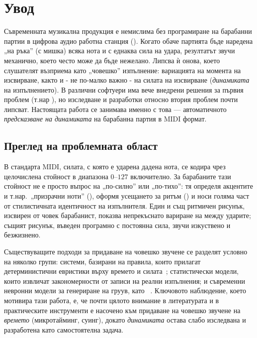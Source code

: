 \chapter{Увод}
\label{ch:uvod}

Съвременната музикална продукция е немислима без програмиране на барабанни
партии в цифрова аудио работна станция ().
Когато обаче партията бъде наредена „на ръка'' (с мишка) всяка нота
и с еднаква сила на удара, резултатът звучи механично, което често може да бъде нежелано.
Липсва ѝ онова, което слушателят възприема като
„човешко'' изпълнение: вариацията на момента на изсвирване, както и -
не по-малко важно - на силата на изсвирване (\emph{динамиката} на изпълнението). 
В различни софтуери има вече внедрени решения за първия проблем (т.нар ),
но изследване и разработки относно втория проблем почти липсват.
Настоящата работа се занимава именно с това —
автоматичното \emph{предсказване на динамиката} на
барабанна партия в MIDI формат.

\section{Преглед на проблемната област}
\label{sec:pregled}

В стандарта MIDI, силата, с която е ударена дадена нота, се кодира чрез
целочислена стойност  в диапазона $0$--$127$ включително. За барабаните тази
стойност не е просто въпрос на „по-силно'' или „по-тихо'': тя определя
акцентите и т.нар.\ „призрачни ноти'' (), оформя усещането за
ритъм () и носи голяма част от стилистичната идентичност на
изпълнителя. Един и същ ритмичен рисунък, изсвирен от човек барабанист, показва
непрекъснато вариране на  между ударите; същият рисунък, въведен
програмно с постоянна сила, звучи изкуствено и безжизнено.

Съществуващите подходи за придаване на човешко звучене се разделят условно на
няколко групи: системи, базирани на правила, които прилагат детерминистични
евристики върху времето и силата~\cite{friberg2006overview}; статистически
модели, които извличат закономерности от записи на реални изпълнения; и
съвременни невронни модели за генериране на груув, като
~\cite{gillick2019groove}. Ключовото наблюдение, което мотивира
тази работа, е, че почти цялото внимание в литературата и в практическите
инструменти е насочено към придаване на човешко звучене на \emph{времето}
(микротайминг, суинг), докато \emph{динамиката} остава слабо изследвана и разработена като
самостоятелна задача.

